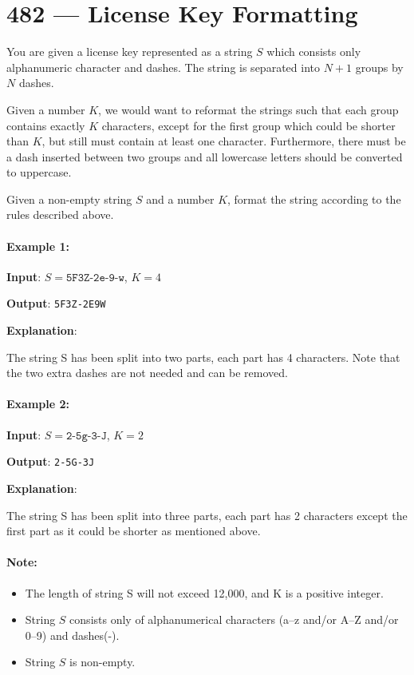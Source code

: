 \section{482 --- License Key Formatting}
You are given a license key represented as a string $S$ which consists only alphanumeric character and dashes. The string is separated into $N+1$ groups by $N$ dashes.

Given a number $K$, we would want to reformat the strings such that each group contains exactly $K$ characters, except for the first group which could be shorter than $K$, but still must contain at least one character. Furthermore, there must be a dash inserted between two groups and all lowercase letters should be converted to uppercase.

Given a non-empty string $S$ and a number $K$, format the string according to the rules described above.

\paragraph{Example 1:}

\begin{flushleft}
\textbf{Input}: $S = \texttt{5F3Z-2e-9-w}$, $K = 4$

\textbf{Output}: \texttt{5F3Z-2E9W}

\textbf{Explanation}: 

The string S has been split into two parts, each part has 4 characters.
Note that the two extra dashes are not needed and can be removed.
\end{flushleft}

\paragraph{Example 2:}

\begin{flushleft}
\textbf{Input}: $S = \texttt{2-5g-3-J}$, $K = 2$

\textbf{Output}: \texttt{2-5G-3J}

\textbf{Explanation}: 

The string S has been split into three parts, each part has 2 characters except the first part as it could be shorter as mentioned above.
\end{flushleft}


\paragraph{Note:}
\begin{itemize}
\item The length of string S will not exceed 12,000, and K is a positive integer.
\item String $S$ consists only of alphanumerical characters (a--z and/or A--Z and/or 0--9) and dashes(-).
\item String $S$ is non-empty.
\end{itemize}


